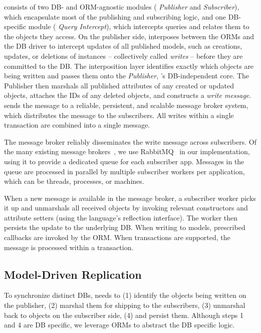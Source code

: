 \synapse consists of two DB- and ORM-agnostic modules ({\em \synapse
Publisher} and {\em \synapse Subscriber}), which encapsulate most of the
publishing and subscribing logic, and one DB-specific module ({\em \synapse
Query Intercept}), which intercepts queries and relates them to the objects they
access. On the publisher side, \synapse interposes between the ORMs and the DB
driver to intercept updates of all published models, such as creations, updates,
or deletions of instances -- collectively called {\em writes} -- before they are
committed to the DB. The interposition layer identifies exactly which objects
are being written and passes them onto the {\em \synapse Publisher},
\synapse's DB-independent core. The Publisher then marshals all published
attributes of any created or updated objects, attaches the IDs of any deleted
objects, and constructs a {\em write message}. \synapse sends the message to a
reliable, persistent, and scalable message broker system, which distributes the
message to the subscribers. All writes within a single transaction are combined
into a single message.

The message broker reliably disseminates the write message across subscribers.
Of the many existing message brokers~\cite{jms,kafka,pubsubhubbub,rabbitmq},
we use RabbitMQ~\cite{rabbitmq} in our implementation, using it to provide a
dedicated queue for each subscriber app. Messages in the queue are processed in
parallel by multiple subscriber workers per application, which can be threads,
processes, or machines.

When a new message is available in the message broker, a \synapse subscriber
worker picks it up and unmarshals all received objects by invoking relevant
constructors and attribute setters (using the language's reflection interface).
The worker then persists the update to the underlying DB. When writing to
models, prescribed callbacks are invoked by the ORM. When transactions are
supported, the message is processed within a transaction.

\subsection{Model-Driven Replication}
\label{synapse:sec:arch:cross-db-propagation}

To synchronize distinct DBs, \synapse needs to (1) identify the objects being
written on the publisher, (2) marshal them for shipping to the subscribers, (3)
unmarshal back to objects on the subscriber side, (4) and persist them.
Although steps 1 and 4 are DB specific, we leverage ORMs to abstract the DB
specific logic.

